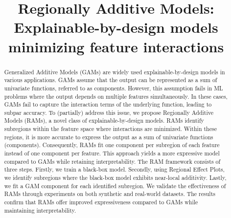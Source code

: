 \documentclass[runningheads]{llncs}
\begin{document}
%
\title{Regionally Additive Models: Explainable-by-design models minimizing feature interactions}
%
%
\author{
}
%
%
\institute{
}
%
\maketitle              %
%
\begin{abstract}
Generalized Additive Models (GAMs) are widely used explainable-by-design models in various applications.
GAMs assume that the output can be represented as a sum of univariate functions, referred to as components.
However, this assumption fails in ML problems where the output depends on multiple features simultaneously.
In these cases, GAMs fail to capture the interaction terms of the underlying function, leading to subpar accuracy.
To (partially) address this issue, we propose Regionally Additive Models (RAMs), a novel class of explainable-by-design models.
RAMs identify subregions within the feature space where interactions are minimized.
Within these regions, it is more accurate to express the output as a sum of univariate functions (components).
Consequently, RAMs fit one component per subregion of each feature instead of one component per feature.
This approach yields a more expressive model compared to GAMs while retaining interpretability.
The RAM framework consists of three steps.
Firstly, we train a black-box model.
Secondly, using Regional Effect Plots, we identify subregions where the black-box model exhibits near-local additivity.
Lastly, we fit a GAM component for each identified subregion.
We validate the effectiveness of RAMs through experiments on both synthetic and real-world datasets.
The results confirm that RAMs offer improved expressiveness compared to GAMs while maintaining interpretability.
\end{abstract}
%
%
%
\end{document}
